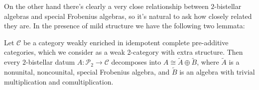 \documentclass[12pt,a4paper]{article}
\numberwithin{equation}{section}
\begin{document}
On the other hand there's clearly a very close relationship between $2$-bistellar algebras and special Frobenius algebras, so it's natural to ask how closely related they are. In the presence of mild structure we have the following two lemmata:

\begin{lemma}\label{lem:2_bistellar_decomposition}
    Let $\mathscr{C}$ be a category weakly enriched in idempotent complete pre-additive categories, which we consider as a weak 2-category with extra structure. Then every $2$-bistellar datum $A: \mathscr{P}_2 \to \mathscr{C}$ decomposes into $A \cong \tilde{A} \oplus \tilde{B}$, where $\tilde{A}$ is a nonunital, noncounital, special Frobenius algebra, and $\tilde{B}$ is an algebra with trivial multiplication and comultiplication.
\end{lemma}
\end{document}
